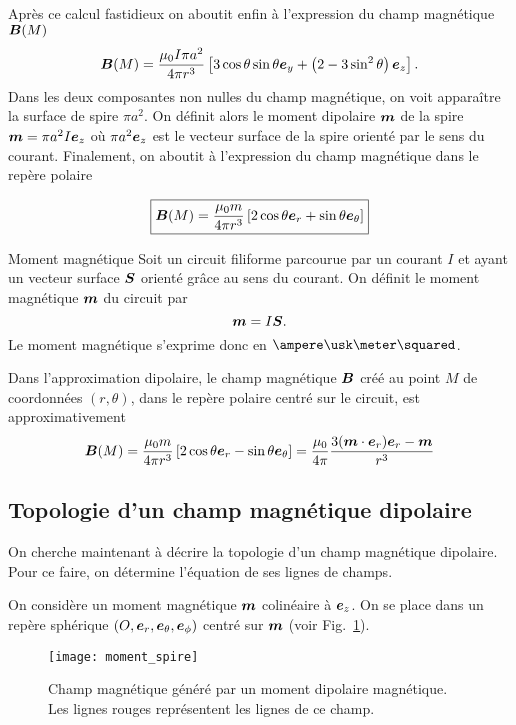 	Après ce calcul fastidieux on aboutit enfin à l'expression du champ magnétique
	$\vecb(M)$
		\begin{equation*}
			\vecb(M) = \dfrac{\mu_0 I \pi a^2}{4 \pi r^3}
			\left[3\cos\theta\sin\theta\ey + \left(2 - 3 \sin^2\theta\right)\ez
			\right].
		\end{equation*}
	Dans les deux composantes non nulles du champ magnétique, on voit apparaître
	la surface de spire $\pi a ^2$. On définit alors le moment dipolaire $\vecm$
	de la spire $\vecm = \pi a^2 I \ez$ où $\pi a^2 \ez$ est le vecteur surface de la 
	spire orienté par le sens du courant. Finalement, on aboutit à l'expression du champ
	magnétique dans le repère polaire

		\begin{equation}
			\boxed{\vecb(M) = \dfrac{\mu_0 m}{4 \pi r^3} 
			\left[2\cos\theta\er + \sin \theta\etheta\right]}
		\end{equation}

	\begin{defn}{Moment magnétique}
		Soit un circuit filiforme parcourue par un courant $I$ et ayant 
		un vecteur surface $\vecs$ orienté grâce au sens du courant. On 
		définit le moment magnétique $\vecm$ du circuit par
		\begin{equation*}
			\vecm = I\vecs.
		\end{equation*}
		Le moment magnétique s'exprime donc en $\ampere \usk
		\meter \squared$.

		Dans l'approximation dipolaire, le champ magnétique $\vecb$ créé au point
		$M$ de coordonnées $(r, \theta)$, dans le repère polaire centré 
		sur le circuit, est approximativement
		\begin{equation*}
			\vecb(M) = \dfrac{\mu_0 m}{4 \pi r^3} 
			\left[2\cos\theta\er - \sin\theta\etheta\right]
			= \dfrac{\mu_0}{4 \pi} \dfrac{3(\vecm \cdot \er)\er - \vecm}
			{r^3}
		\end{equation*}
	\end{defn}
	
	\subsection{Topologie d'un champ magnétique dipolaire}
	On cherche maintenant à décrire la topologie d'un champ magnétique
	dipolaire. Pour ce faire, on détermine l'équation de ses lignes de champs.

	On considère un moment magnétique $\vecm$ colinéaire à $\ez$. On se place
	dans un repère sphérique $(O, \er, \etheta, \ephi)$ centré sur $\vecm$ 
	(voir Fig.~\ref{fig:aimant_moment_spire}). 
	\begin{figure}[htpb]
		\centering
		\texttt{[image: moment\_spire]}
		\caption{Champ magnétique généré par un moment dipolaire 
		magnétique. Les lignes rouges représentent les lignes de ce 
		champ.}%
		\label{fig:aimant_moment_spire}
	\end{figure}
	
